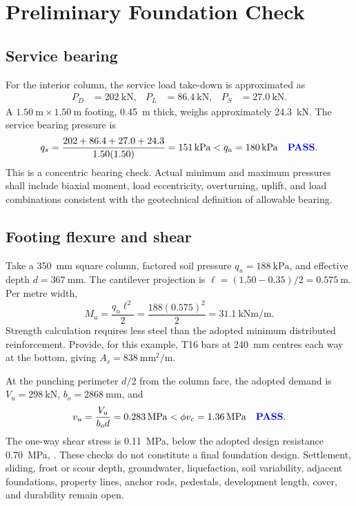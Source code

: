 \section{Preliminary Foundation Check}

\subsection{Service bearing}
For the interior column, the service load take-down is approximated as
\begin{align}
  P_D &= \SI{202}{\kilo\newton}, &
  P_L &= \SI{86.4}{\kilo\newton}, &
  P_S &= \SI{27.0}{\kilo\newton}.
\end{align}
A \(\SI{1.50}{\metre}\times\SI{1.50}{\metre}\) footing, \SI{0.45}{\metre} thick,
weighs approximately \SI{24.3}{\kilo\newton}. The service bearing pressure is
\begin{equation}
  q_s=\frac{202+86.4+27.0+24.3}{1.50(1.50)}
     =\SI{151}{\kilo\pascal}
     <q_a=\SI{180}{\kilo\pascal}\quad \textcolor{blue}{\textbf{PASS}}.
\end{equation}
This is a concentric bearing check. Actual minimum and maximum pressures shall
include biaxial moment, load eccentricity, overturning, uplift, and load combinations
consistent with the geotechnical definition of allowable bearing.

\subsection{Footing flexure and shear}
Take a \SI{350}{\milli\metre} square column, factored soil pressure
$q_u=\SI{188}{\kilo\pascal}$, and effective depth
$d=\SI{367}{\milli\metre}$. The cantilever projection is
$\ell=(1.50-0.35)/2=\SI{0.575}{\metre}$. Per metre width,
\begin{equation}
  M_u=\frac{q_u\ell^2}{2}=\frac{188(0.575)^2}{2}
     =\SI{31.1}{\kilo\newton\metre\per\metre}.
\end{equation}
Strength calculation requires less steel than the adopted minimum distributed
reinforcement. Provide, for this example, T16 bars at \SI{240}{\milli\metre}
centres each way at the bottom, giving
$A_s=\SI{838}{\milli\metre\squared\per\metre}$.

At the punching perimeter $d/2$ from the column face, the adopted demand is
$V_u=\SI{298}{\kilo\newton}$, $b_o=\SI{2868}{\milli\metre}$, and
\begin{equation}
  v_u=\frac{V_u}{b_od}=\SI{0.283}{\mega\pascal}
  <\phi v_c=\SI{1.36}{\mega\pascal}\quad \textcolor{blue}{\textbf{PASS}}.
\end{equation}
The one-way shear stress is \SI{0.11}{\mega\pascal}, below the adopted design
resistance \SI{0.70}{\mega\pascal}, \ok. These checks do not constitute a final
foundation design. Settlement, sliding, frost or scour depth, groundwater,
liquefaction, soil variability, adjacent foundations, property lines, anchor rods,
pedestals, development length, cover, and durability remain open.

